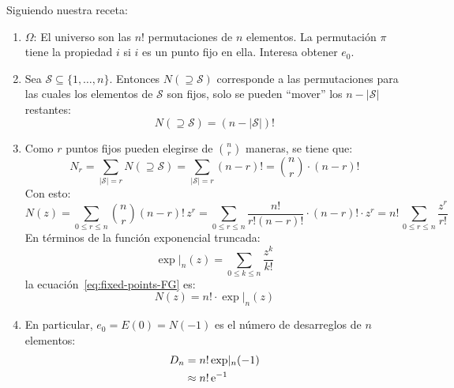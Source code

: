   Siguiendo nuestra receta:
  \begin{enumerate}
  \item \(\Omega\):
    El universo son las \(n!\) permutaciones de \(n\) elementos.
    La permutación \(\pi\) tiene la propiedad \(i\)
    si \(i\) es un punto fijo en ella.
    Interesa obtener \(e_0\).
  \item
    Sea \(\mathcal{S} \subseteq \{1, \dotsc, n\}\).
    Entonces \(N(\supseteq \mathcal{S})\)
    corresponde a las permutaciones
    para las cuales los elementos de \(\mathcal{S}\) son fijos,
    solo se pueden ``mover''
    los \(n - \lvert \mathcal{S} \rvert\) restantes:
    \begin{equation*}
      N(\supseteq \mathcal{S})
	= \left(n - \lvert \mathcal{S} \rvert\right)!
    \end{equation*}
  \item
    Como \(r\) puntos fijos
    pueden elegirse de \(\binom{n}{r}\) maneras,
    se tiene que:
    \begin{equation}
      \label{eq:fixed-points-Nr}
      N_r
	= \sum_{\lvert \mathcal{S} \rvert = r}
	    N(\supseteq \mathcal{S})
	= \sum_{\lvert \mathcal{S} \rvert = r} (n - r)!
	= \binom{n}{r} \cdot (n - r)!
    \end{equation}
    Con esto:
    \begin{equation}
      \label{eq:fixed-points-FG}
      N(z)
	= \sum_{0 \le r \le n} \binom{n}{r} (n - r)! \, z^r
	= \sum_{0 \le r \le n}
	     \frac{n!}{r!(n - r)!} \cdot (n - r)! \cdot z^r
	= n! \, \sum_{0 \le r \le n} \frac{z^r}{r!}
    \end{equation}
    En términos de la función exponencial truncada:%
    \begin{equation}
      \label{eq:exp-truncada}
      \exp \rvert_n (z)
	= \sum_{0 \le k \le n} \frac{z^k}{k!}
    \end{equation}
    la ecuación~\eqref{eq:fixed-points-FG} es:
    \begin{equation*}
      N(z) = n! \cdot \exp \rvert_n (z)
    \end{equation*}
  \item
    En particular,
    \(e_0 = E(0) = N(-1)\)
    es el número de desarreglos de \(n\) elementos:
    \begin{align}
      D_n
	&=	   n! \exp \rvert_n (-1)
	    \label{eq:n-derangements} \\
	&\approx n! \, \mathrm{e}^{-1}
	    \label{eq:n-derangements-approx}
      \index{desarreglo!numero de, formula@número de, fórmula}
    \end{align}


\end{enumerate}
